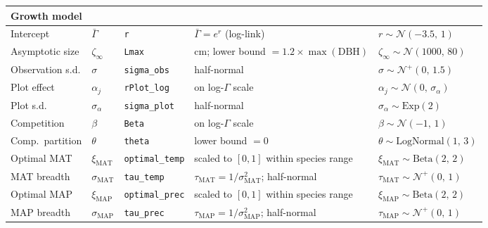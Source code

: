 \begin{longtable}{@{}p{2.1cm} p{2.1cm} p{2.1cm} p{4.3cm} p{3.6cm}@{}}
\multicolumn{5}{l}{\textbf{Growth model}}\\
\midrule
Intercept & $\bar{\Gamma}$ & \texttt{r} & $\bar{\Gamma}=e^{r}$ (log-link) & $r\sim\mathcal{N}(-3.5,\,1)$ \\
Asymptotic size & $\zeta_{\infty}$ & \texttt{Lmax} & cm; lower bound $=1.2\times\max(\mathrm{DBH})$ & $\zeta_{\infty}\sim\mathcal{N}(1000,\,80)$ \\
Observation s.d. & $\sigma$ & \texttt{sigma\_obs} & half-normal & $\sigma\sim\mathcal{N}^{+}(0,\,1.5)$ \\
Plot effect & $\alpha_{j}$ & \texttt{rPlot\_log} & on log-$\Gamma$ scale & $\alpha_{j}\sim\mathcal{N}(0,\,\sigma_{\alpha})$ \\
Plot s.d. & $\sigma_{\alpha}$ & \texttt{sigma\_plot} & half-normal & $\sigma_{\alpha}\sim\mathrm{Exp}(2)$ \\
Competition & $\beta$ & \texttt{Beta} & on log-$\Gamma$ scale & $\beta\sim\mathcal{N}(-1,\,1)$ \\
Comp.\ partition & $\theta$ & \texttt{theta} & lower bound $=0$ & $\theta\sim\mathrm{LogNormal}(1,\,3)$ \\
Optimal MAT & $\xi_{\mathrm{MAT}}$ & \texttt{optimal\_temp} & scaled to $[0,1]$ within species range & $\xi_{\mathrm{MAT}}\sim\mathrm{Beta}(2,\,2)$ \\
MAT breadth & $\sigma_{\mathrm{MAT}}$ & \texttt{tau\_temp} & $\tau_{\mathrm{MAT}}=1/\sigma_{\mathrm{MAT}}^{2}$; half-normal & $\tau_{\mathrm{MAT}}\sim\mathcal{N}^{+}(0,\,1)$ \\
Optimal MAP & $\xi_{\mathrm{MAP}}$ & \texttt{optimal\_prec} & scaled to $[0,1]$ within species range & $\xi_{\mathrm{MAP}}\sim\mathrm{Beta}(2,\,2)$ \\
MAP breadth & $\sigma_{\mathrm{MAP}}$ & \texttt{tau\_prec} & $\tau_{\mathrm{MAP}}=1/\sigma_{\mathrm{MAP}}^{2}$; half-normal & $\tau_{\mathrm{MAP}}\sim\mathcal{N}^{+}(0,\,1)$ \\
\midrule


\end{longtable}
